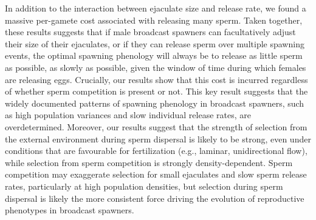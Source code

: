 \documentclass{article}
\begin{document}
In addition to the interaction between ejaculate size and release rate, we found a massive per-gamete cost associated with releasing many sperm. Taken together, these results suggests that if male broadcast spawners can facultatively adjust their size of their ejaculates, or if they can release sperm over multiple spawning events, the optimal spawning phenology will always be to release as little sperm as possible, as slowly as possible, given the window of time during which females are releasing eggs. Crucially, our results show that this cost is incurred regardless of whether sperm competition is present or not. This key result suggests that the widely documented patterns of spawning phenology in broadcast spawners, such as high population variances and slow individual release rates, are overdetermined. Moreover, our results suggest that the strength of selection from the external environment during sperm dispersal is likely to be strong, even under conditions that are favourable for fertilization (e.g., laminar, unidirectional flow), while selection from sperm competition is strongly density-dependent. Sperm competition may exaggerate selection for small ejaculates and slow sperm release rates, particularly at high population densities, but selection during sperm dispersal is likely the more consistent force driving the evolution of reproductive phenotypes in broadcast spawners.




\end{document}
